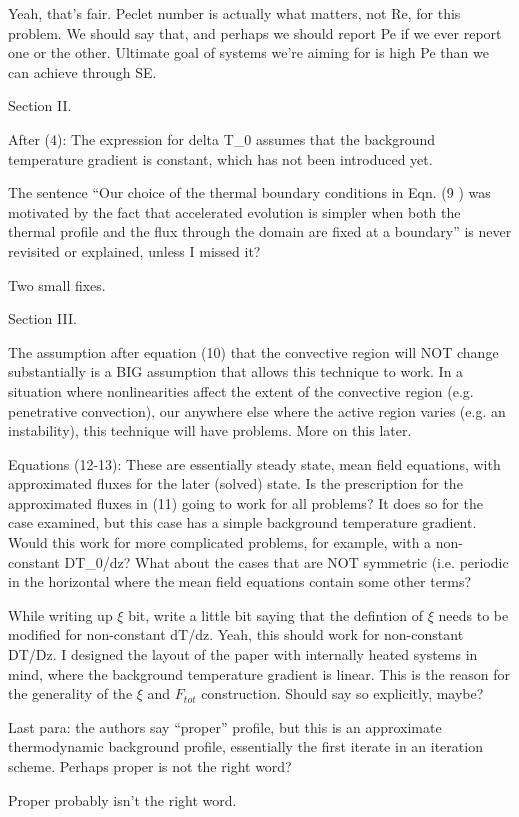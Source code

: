 \documentclass[aps, 11pt, singlecolumn]{revtex4-1} %
\begin{document}
\begin{singlespace}
Yeah, that's fair. Peclet number is actually what matters, not Re, for
this problem. We should say that, and perhaps we should report Pe if we
ever report one or the other. Ultimate goal of systems we're aiming for is
high Pe than we can achieve through SE.

\begin{myquotation}
Section II.

After (4): The expression for delta T\_0 assumes that the background
temperature gradient is constant, which has not been introduced yet.

The sentence ``Our choice of the thermal boundary conditions in Eqn.
(9 ) was motivated by the fact that accelerated evolution is simpler
when both the thermal profile and the flux through the domain are
fixed at a boundary'' is never revisited or explained, unless I missed
it?
\end{myquotation}
Two small fixes.

\begin{myquotation}
Section III.

The assumption after equation (10) that the convective region will NOT
change substantially is a BIG assumption that allows this technique to
work. In a situation where nonlinearities affect the extent of the
convective region (e.g. penetrative convection), our anywhere else
where the active region varies (e.g. an instability), this technique
will have problems. More on this later.

Equations (12-13): These are essentially steady state, mean field
equations, with approximated fluxes for the later (solved) state. Is
the prescription for the approximated fluxes in (11) going to work for
all problems? It does so for the case examined, but this case has a
simple background temperature gradient. Would this work for more
complicated problems, for example, with a non-constant DT\_0/dz? What
about the cases that are NOT symmetric (i.e. periodic in the
horizontal where the mean field equations contain some other terms?
\end{myquotation}
While writing up $\xi$ bit, write a little bit saying that the defintion of
$\xi$ needs to be modified for non-constant dT/dz.
Yeah, this should work for non-constant DT/Dz. I designed the layout of the
paper with internally heated systems in mind, where the background temperature
gradient is linear. This is the reason for the generality of the $\xi$
and $F_{tot}$ construction. Should say so explicitly, maybe?

\begin{myquotation}
Last para: the authors say “proper” profile, but this is an
approximate thermodynamic background profile, essentially the first
iterate in an iteration scheme. Perhaps proper is not the right word?
\end{myquotation}
Proper probably isn't the right word.


\end{singlespace}
\end{document}
